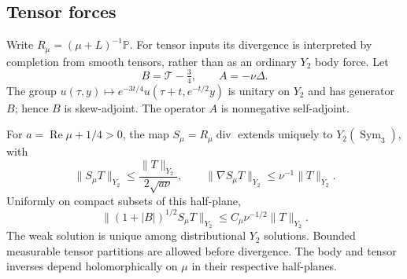 \subsection{Tensor forces}

Write \(R_\mu=(\mu+L)^{-1}\mathbb P\). For tensor inputs its
divergence is interpreted by completion from smooth tensors, rather
than as an ordinary \(Y_2\) body force. Let
\[
 B=\mathcal T-\tfrac34,\qquad A=-\nu\Delta.
\]
The group \(u(\tau,y)\mapsto e^{-3t/4}u(\tau+t,e^{-t/2}y)\) is
unitary on \(Y_2\) and has generator \(B\); hence \(B\) is skew-adjoint.
The operator \(A\) is nonnegative self-adjoint.

\begin{lemma}\label{free:weak-stress}
For \(a=\operatorname{Re}\mu+1/4>0\), the map
\(S_\mu=R_\mu\operatorname{div}\) extends uniquely to
\(Y_2(\operatorname{Sym}_3)\), with
\begin{equation}\label{free:stress-energy}
 \|S_\mu T\|_{Y_2}\le\frac{\|T\|_{Y_2}}{2\sqrt{a\nu}},\qquad
 \|\nabla S_\mu T\|_{Y_2}\le\nu^{-1}\|T\|_{Y_2}.
\end{equation}
Uniformly on compact subsets of this half-plane,
\begin{equation}\label{free:half-drift}
 \|(1+|B|)^{1/2}S_\mu T\|_{Y_2}
       \le C_\mu\nu^{-1/2}\|T\|_{Y_2}.
\end{equation}
The weak solution is unique among distributional \(Y_2\) solutions.
Bounded measurable tensor partitions are allowed before divergence.
The body and tensor inverses depend
holomorphically on \(\mu\) in their respective half-planes.
\end{lemma}

